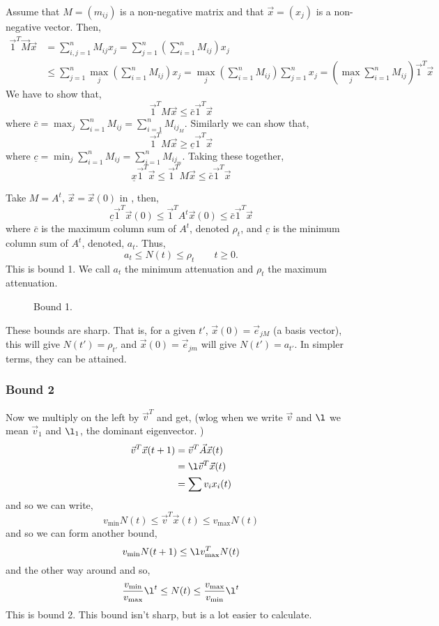 \noindent
Assume that $M = (m_{ij})$ is a non-negative matrix and that $\vec x = (x_j)$ is a non-negative vector. Then,
\begin{align*}
  \vec 1^T \vec M \vec x &= \sum_{i,j = 1}^n M_{ij}x_j = \sum_{j=1}^n \left(\sum_{i=1}^n M_{ij}\right)x_j\\
  &\le \sum_{j=1}^n \max_j \left(\sum_{i=1}^n M_{ij} \right)x_j = \max_j \left(\sum_{i=1}^n M_{ij} \right) \sum_{j=1}^n x_j = \left( \max_j \sum_{i=1}^n M_{ij} \right)\vec 1^T \vec x
\end{align*}
We have to show that,
$$ \vec 1^T M\vec x \le \bar c \vec 1^T \vec x $$
where $\bar c = \max_j \sum_{i=1}^n M_{ij} = \sum_{i=1}^n M_{ij_M}$. Similarly we can show that,
$$ \vec 1^T M\vec x \ge \underline c \vec 1^T\vec x $$
where $\underline c = \min_j \sum_{i=1}^n M_{ij} = \sum_{i=1}^n M_{ij_m}$. Taking these together,
\begin{equation}
  \underline x \vec 1^T \vec x \le \vec 1^T M\vec x \le \bar c \vec 1^T \vec x \tag{*}\label{equ:star}
\end{equation}

\noindent
Take $M = A^t$, $\vec x = \vec x(0)$ in , then,
$$ \underline c \vec 1^T \vec x(0) \le \vec 1^T A^t \vec x(0) \le \bar c \vec 1^T \vec x $$
where $\bar c$ is the maximum column sum of $A^t$, denoted $\rho_t$, and $\underline c$ is the minimum column sum of $A^t$, denoted, $a_t$. Thus,
$$ a_t \le N(t) \le \rho_t \qquad t \ge 0. $$
This is bound 1. We call $a_t$ the minimum attenuation and $\rho_t$ the maximum attenuation.
\begin{figure}[!ht]
\centering
\resizebox{0.48\textwidth}{!}{}
\caption{Bound 1.}
\end{figure}
These bounds are sharp. That is, for a given $t'$, $\vec x(0) = \vec e_{jM}$ (a basis vector), this will give $N(t') = \rho_{t'}$ and $\vec x(0) = \vec e_{jm}$ will give $N(t') = a_{t'}$. In simpler terms, they can be attained.

\noindent
\subsubsection{Bound 2}

Now we multiply on the left by $\vec v^T$ and get, (wlog when we write $\vec v$ and $\l$ we mean $\vec v_1$ and $\l_1$, the dominant eigenvector. )
\begin{align*}
  \vec v^T \vec x(t+1) &= \vec v^T \vec A\vec x(t) \\
  &= \l \vec v^T\vec x(t) \\
  &= \sum v_i x_i(t)
\end{align*}
and so we can write,
$$ v_{\text{min}}N(t) \le \vec v^T \vec x(t) \le v_{\text{max}}N(t) $$
and so we can form another bound,
$$ v_{\text{min}}N(t+1) \le \l v^T_{\max}N(t) $$
and the other way around and so,
$$\frac{v_{\text{min}}}{v_{\text{max}}}\l^t \le N(t) \le \frac{v_{\text{max}}}{v_{\text{min}}}\l^t $$
This is bound 2. This bound isn't sharp, but is a lot easier to calculate.
